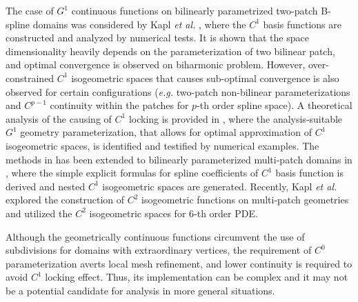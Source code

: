 \documentclass[preprint,12pt]{elsarticle}
\theoremstyle{remark}
\begin{document}
The case of $G^1$ continuous functions on bilinearly parametrized two-patch B-spline domains was considered by Kapl \textit{et al.} \cite{kapl_isogeometric_2015}, where the $C^1$ basis functions are constructed and analyzed by numerical tests. It is shown that the space dimensionality heavily depends on the parameterization of two bilinear patch, and optimal convergence is observed on biharmonic problem. However, over-constrained $C^1$ isogeometric spaces that causes sub-optimal convergence is also observed for certain configurations (\textit{e.g.} two-patch non-bilinear parameterizations and $C^{p-1}$ continuity within the patches for $p$-th order spline space). A theoretical analysis of the causing of $C^1$ locking is provided in \cite{collin_analysis-suitable_2016}, where the analysis-suitable $G^1$ geometry parameterization, that allows for optimal approximation of $C^1$ isogeometric spaces, is identified and testified by numerical examples. The methods in \cite{kapl_isogeometric_2015} has been extended to bilinearly parameterized multi-patch domains in \cite{kapl_isogeometric_2017}, where the simple explicit formulas for spline coefficients of $C^1$ basis function is derived and nested $C^1$ isogeometric spaces are generated. Recently, Kapl \textit{et al.} \cite{kapl_space_2017,kapl_space_nodate} explored the construction of $C^2$ isogeometric functions on multi-patch geometries and utilized the $C^2$ isogeometric spaces for $6$-th order PDE.\par
Although the geometrically continuous functions circumvent the use of subdivisions for domains with extraordinary vertices, the requirement of $C^0$ parameterization averts local mesh refinement, and lower continuity is required to avoid $C^1$ locking effect. Thus, its implementation can be complex and it may not be a potential candidate for analysis in more general situations.\par
\end{document}
